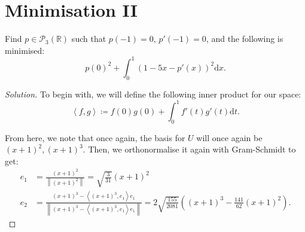 \documentclass{article}
\newenvironment{solution}{\begin{proof}[Solution]}{\end{proof}}
\newcommand{\norm}[1]{\left\lVert{#1}\right\rVert}
\newcommand{\RR}{\mathbb{R}}
\newcommand{\innerproduct}[2]{\left\langle{#1}, {#2}\right\rangle}
\begin{document}
	\newpage
	
	\section{Minimisation II}
	\begin{hw}
		Find $p \in \mathscr{P}_{3}(\RR)$ such that $p(-1) = 0$, $p'(-1) = 0$, and the following is minimised:
		\begin{equation*}
			p(0)^{2} + \int_{0}^{1} (1-5x - p'(x))^{2} \mathrm dx.
		\end{equation*}
	\end{hw}
	\begin{solution}
		\begin{comment}
			To begin with, we will define the following inner product for our space:
			\begin{equation*}
				\innerproduct{f}{g} \coloneq f(0)g(0) + \int_{0}^{1} f'(t)g'(t) \mathrm dt. 
			\end{equation*}
			
			From here, we note that once again, the basis for $U$ will once again be $(x+1)^{2}, (x+1)^{3}$. Then, we let $q(x) = x - \frac{5}{2}x^{2}$ as before, and let
			\begin{equation*}
				p = \frac{\innerproduct{q}{(x+1)^{2}}}{\innerproduct{(x+1)^{2}}{(x+1)^{2}}}(x+1)^{2} + \frac{\innerproduct{q}{(x+1)^{3}}}{\innerproduct{(x+1)^{3}}{(x+1)^{3}}}(x+1)^{3}.
			\end{equation*}
			
			Through some computations, we will see then that we will get:
			\begin{equation*}
				p(x) = -\frac{16}{31}(x+1)^{2} - \frac{285}{1136}(x+1)^{3}. 
			\end{equation*}
		\end{comment}
		
		To begin with, we will define the following inner product for our space:
		\begin{equation*}
			\innerproduct{f}{g} \coloneq f(0)g(0) + \int_{0}^{1} f'(t)g'(t) \mathrm dt. 
		\end{equation*}
		
		From here, we note that once again, the basis for $U$ will once again be $(x+1)^{2}, (x+1)^{3}$. Then, we orthonormalise it again with Gram-Schmidt to get:
		\begin{align*}
			e_{1} &= \frac{(x+1)^{2}}{\norm{(x+1)^{2}}} = \sqrt{\frac{3}{31}}(x+1)^{2} \\
			e_{2} &= \frac{(x+1)^{3} - \innerproduct{(x+1)^{3}}{e_{1}}e_{1}}{\norm{(x+1)^{3} - \innerproduct{(x+1)^{3}}{e_{1}}e_{1}}} = 2\sqrt{\frac{155}{2081}}\left( (x+1)^{3} - \frac{141}{62}(x+1)^{2} \right).
		\end{align*}
		

\end{solution}
\end{document}
